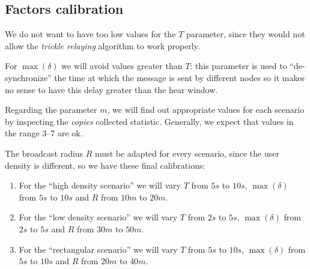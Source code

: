 \subsection{Factors calibration}\label{subsec:calibration}

We do not want to have too low values for the \(T\) parameter, since they would
not allow the \emph{trickle relaying} algorithm to work properly.

For \(\max(\delta)\) we will avoid values greater than \(T\): this parameter
is used to ``de-synchronize'' the time at which the message is sent by different
nodes so it makes no sense to have this delay greater than the hear window.

Regarding the parameter \(m\), we will find out appropriate values for each
scenario by inspecting the \textit{copies} collected statistic. Generally, we
expect that values in the range 3--7 are ok.

The broadcast radius \(R\) must be adapted for every scenario, since the user
density is different, so we have these final calibrations:
\begin{enumerate}
	\item For the ``high density scenario'' we will vary \(T\) from \(5s\)
		to \(10s\), \(\max(\delta)\) from \(5s\) to \(10s\) and \(R\)
		from \(10m\) to \(20m\).
	\item For the ``low density scenario'' we will vary \(T\) from \(2s\)
		to \(5s\), \(\max(\delta)\) from \(2s\) to \(5s\) and \(R\)
		from \(30m\) to \(50m\).
	\item For the ``rectangular scenario'' we will vary \(T\) from \(5s\)
		to \(10s\), \(\max(\delta)\) from \(5s\) to \(10s\) and \(R\)
		from \(20m\) to \(40m\).
\end{enumerate}
